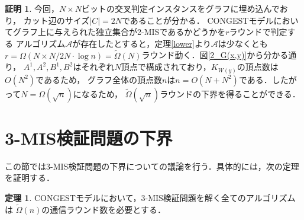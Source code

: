\documentclass[12pt]{thesis}
\newcommand{\CONGEST}{\textsf{CONGEST}}
\theoremstyle{definition}
\newtheorem{theorem}{定理}[chapter]
\newtheorem*{prf*}{証明}
\begin{document}
\begin{prf*}
今回，$N \times N$ビットの交叉判定インスタンスをグラフに埋め込んでおり，
カット辺のサイズ$|C| = 2N$であることが分かる．
{\CONGEST}モデルにおいてグラフ上に与えられた独立集合が2-MISであるかどうかを$r$ラウンドで判定する
アルゴリズム$\mathcal{A}$が存在したとすると，定理\ref{lower}より$\mathcal{A}$は少なくとも
$r = \Omega (N \times N/ 2N \cdot \log n) = \tilde{\Omega}(N)$ラウンド動く．図\ref{2_G(x,y)}から分かる通り，
$A^{1}, A^{2}, B^{1}, B^{2}$はそれぞれ$N$頂点で構成されており，$K_{W(y)}$の頂点数は$O(N^{2})$であるため，
グラフ全体の頂点数$n$は$n = O(N + N^{2})$である．したがって$N = \Omega(\sqrt{n})$になるため，
$\tilde{\Omega}(\sqrt{n})$ラウンドの下界を得ることができる．
\end{prf*}
\newpage

\section{3-MIS検証問題の下界}
この節では3-MIS検証問題の下界についての議論を行う．具体的には，次の定理を証明する．
\begin{theorem}
{\CONGEST}モデルにおいて，3-MIS検証問題を解く全てのアルゴリズムは
$\tilde{\Omega} (n)$の通信ラウンド数を必要とする．
\end{theorem}
\end{document}
